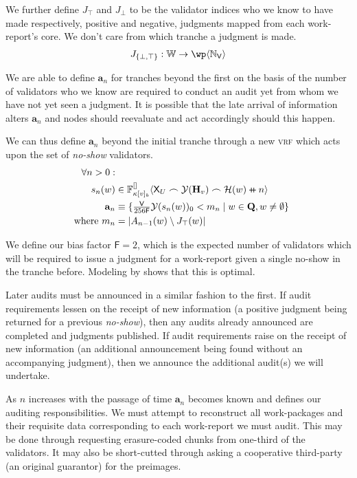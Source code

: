 We further define $J_\top$ and $J_\bot$ to be the validator indices who we know to have made respectively, positive and negative, judgments mapped from each work-report's core. We don't care from which tranche a judgment is made.
\begin{align}
  J_{\{\bot, \top\}}: \mathbb{W} \to \powset{\N_\mathsf{V}}
\end{align}

We are able to define $\mathbf{a}_n$ for tranches beyond the first on the basis of the number of validators who we know are required to conduct an audit yet from whom we have not yet seen a judgment. It is possible that the late arrival of information alters $\mathbf{a}_n$ and nodes should reevaluate and act accordingly should this happen.

We can thus define $\mathbf{a}_n$ beyond the initial tranche through a new \textsc{vrf} which acts upon the set of \emph{no-show} validators.
\begin{align}
  \nonumber\forall n > 0:&\\
  \ s_n(w) &\in \bandersig{\kappa[v]_b}{\mathsf{X}_U \concat \banderout{\mathbf{H}_v}\concat\hash(w)\doubleplus n}{[]} \\
  \ \mathbf{a}_n &\equiv \{ \textstyle\frac{\mathsf{V}}{256\mathsf{F}}\banderout{s_n(w)}_0 < m_n \mid w \in \mathbf{Q}, w \ne \none \}\!\!\!\!\\
  \nonumber \where m_n &= |A_{n - 1}(w) \setminus J_\top(w)|
\end{align}

We define our bias factor $\mathsf{F} = 2$, which is the expected number of validators which will be required to issue a judgment for a work-report given a single no-show in the tranche before. Modeling by \cite{cryptoeprint:2024/961} shows that this is optimal.

Later audits must be announced in a similar fashion to the first. If audit requirements lessen on the receipt of new information (\ie a positive judgment being returned for a previous \emph{no-show}), then any audits already announced are completed and judgments published. If audit requirements raise on the receipt of new information (\ie an additional announcement being found without an accompanying judgment), then we announce the additional audit(s) we will undertake.

As $n$ increases with the passage of time $\mathbf{a}_n$ becomes known and defines our auditing responsibilities. We must attempt to reconstruct all work-packages and their requisite data corresponding to each work-report we must audit. This may be done through requesting erasure-coded chunks from one-third of the validators. It may also be short-cutted through asking a cooperative third-party (\eg an original guarantor) for the preimages.

